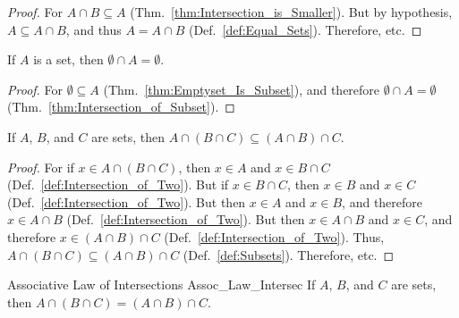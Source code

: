         \begin{proof}
            For $A\cap{B}\subseteq{A}$
            (Thm.~\ref{thm:Intersection_is_Smaller}). But
            by hypothesis, $A\subseteq{A}\cap{B}$, and thus
            $A=A\cap{B}$ (Def.~\ref{def:Equal_Sets}).
            Therefore, etc.
        \end{proof}
        \begin{theorem}
            If $A$ is a set, then
            $\emptyset\cap{A}=\emptyset$.
        \end{theorem}
        \begin{proof}
            For $\emptyset\subseteq{A}$
            (Thm.~\ref{thm:Emptyset_Is_Subset}), and
            therefore $\emptyset\cap{A}=\emptyset$
            (Thm.~\ref{thm:Intersection_of_Subset}).
        \end{proof}
        \begin{theorem}
            \label{thm:First_Assoc_Law_Intersec}%
            If $A$, $B$, and $C$ are sets, then
            $A\cap(B\cap{C})\subseteq(A\cap{B})\cap{C}$.
        \end{theorem}
        \begin{proof}
            For if $x\in{A}\cap(B\cap{C})$, then $x\in{A}$
            and $x\in{B}\cap{C}$
            (Def.~\ref{def:Intersection_of_Two}). But if
            $x\in{B}\cap{C}$, then $x\in{B}$ and $x\in{C}$
            (Def.~\ref{def:Intersection_of_Two}). But then
            $x\in{A}$ and $x\in{B}$, and therefore
            $x\in{A}\cap{B}$
            (Def.~\ref{def:Intersection_of_Two}). But
            then $x\in{A}\cap{B}$ and $x\in{C}$, and
            therefore $x\in(A\cap{B})\cap{C}$
            (Def.~\ref{def:Intersection_of_Two}). Thus,
            $A\cap(B\cap{C})\subseteq(A\cap{B})\cap{C}$
            (Def.~\ref{def:Subsets}). Therefore, etc.
        \end{proof}
        \begin{ltheorem}{Associative Law of Intersections}
              {Assoc_Law_Intersec}
            If $A$, $B$, and $C$ are sets, then
            $A\cap(B\cap{C})=(A\cap{B})\cap{C}$.
        \end{ltheorem}
